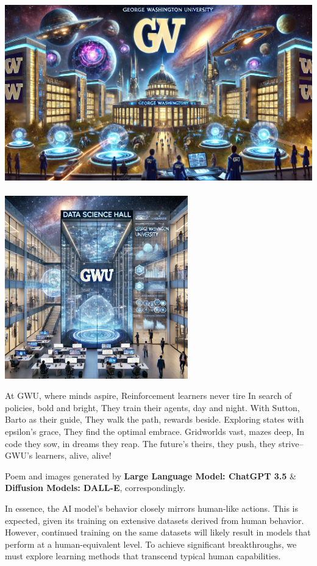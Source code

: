 \documentclass[
  letterpaper,
  DIV=11,
  numbers=noendperiod]{scrreprt}
\begin{document}
\includegraphics[width=1\linewidth,height=3.125in]{lecture1/images/diffusion.png}

\includegraphics[width=1\linewidth,height=3.125in]{lecture1/images/diffusion2.png}

At GWU, where minds aspire, Reinforcement learners never tire In search
of policies, bold and bright, They train their agents, day and night.
With Sutton, Barto as their guide, They walk the path, rewards beside.
Exploring states with epsilon's grace, They find the optimal embrace.
Gridworlds vast, mazes deep, In code they sow, in dreams they reap. The
future's theirs, they push, they strive-- GWU's learners, alive, alive!

Poem and images generated by \textbf{Large Language Model: ChatGPT 3.5}
\& \textbf{Diffusion Models: DALL-E}, correspondingly.

In essence, the AI model's behavior closely mirrors human-like actions.
This is expected, given its training on extensive datasets derived from
human behavior. However, continued training on the same datasets will
likely result in models that perform at a human-equivalent level. To
achieve significant breakthroughs, we must explore learning methods that
transcend typical human capabilities.
\end{document}
